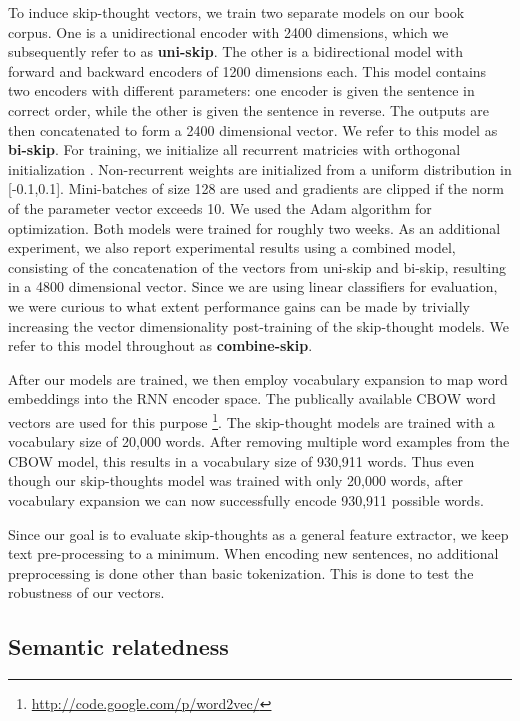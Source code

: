 \documentclass{article} \usepackage{nips15submit_e,times}
\begin{document}
To induce skip-thought vectors, we train two separate models on our book corpus. One is a unidirectional encoder with 2400 dimensions, which we subsequently refer to as {\bf uni-skip}. The other is a bidirectional model with forward and backward encoders of 1200 dimensions each. This model contains two encoders with different parameters: one encoder is given the sentence in correct order, while the other is given the sentence in reverse. The outputs are then concatenated to form a 2400 dimensional vector. We refer to this model as {\bf bi-skip}. For training, we initialize all recurrent matricies with orthogonal initialization \cite{saxe2013exact}. Non-recurrent weights are initialized from a uniform distribution in [-0.1,0.1]. Mini-batches of size 128 are used and gradients are clipped if the norm of the parameter vector exceeds 10. We used the Adam algorithm \cite{kingma2014adam} for optimization. Both models were trained for roughly two weeks. As an additional experiment, we also report experimental results using a combined model, consisting of the concatenation of the vectors from uni-skip and bi-skip, resulting in a 4800 dimensional vector. Since we are using linear classifiers for evaluation, we were curious to what extent performance gains can be made by trivially increasing the vector dimensionality post-training of the skip-thought models. We refer to this model throughout as {\bf combine-skip}.

After our models are trained, we then employ vocabulary expansion to map word embeddings into the RNN encoder space. The publically available CBOW word vectors are used for this purpose \footnote{\url{http://code.google.com/p/word2vec/}}. The skip-thought models are trained with a vocabulary size of 20,000 words. After removing multiple word examples from the CBOW model, this results in a vocabulary size of 930,911 words. Thus even though our skip-thoughts model was trained with only 20,000 words, after vocabulary expansion we can now successfully encode 930,911 possible words.

Since our goal is to evaluate skip-thoughts as a general feature extractor, we keep text pre-processing to a minimum. When encoding new sentences, no additional preprocessing is done other than basic tokenization. This is done to test the robustness of our vectors.


\subsection{Semantic relatedness}
\end{document}
